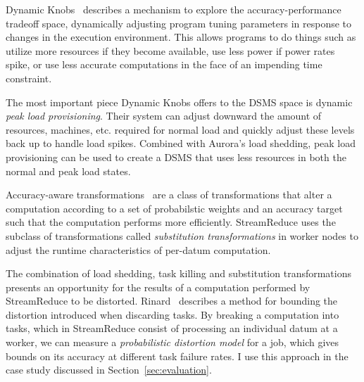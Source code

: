 \documentclass[12pt,twocolumn]{article}
\begin{document}
Dynamic Knobs~\cite{Hoffmann:2011:DKR:1950365.1950390} describes a mechanism to explore the
accuracy-performance tradeoff space, dynamically adjusting program tuning parameters in response
to changes in the execution environment. This allows programs to do things such as
utilize more resources if they become available, use less power if power rates spike,
or use less accurate computations in the face of an impending time constraint.

The most important piece Dynamic Knobs offers to the DSMS space is dynamic
\emph{peak load provisioning}. Their system can adjust downward the amount of resources,
machines, etc. required for normal load and quickly adjust these levels back up to
handle load spikes. Combined with Aurora's load shedding, peak load provisioning can
be used to create a DSMS that uses less resources in both the normal and peak load
states.

Accuracy-aware transformations~\cite{Zhu:2012:RAP:2103656.2103710} are a class of transformations
that alter a computation according to a set of probabilstic weights and an accuracy
target such that the computation performs more efficiently. StreamReduce uses the subclass
of transformations called \emph{substitution transformations} in worker nodes to adjust
the runtime characteristics of per-datum computation.

The combination of load shedding, task killing and substitution transformations presents
an opportunity for the results of a computation performed by StreamReduce to be distorted.
Rinard~\cite{Rinard:2006:PAB:1183401.1183447} describes a method for bounding the distortion
introduced when discarding tasks. By breaking a computation into tasks, which in StreamReduce
consist of processing an individual datum at a worker, we can measure a
\emph{probabilistic distortion model} for a job, which gives bounds on its accuracy at different
task failure rates. I use this approach in the case study discussed in Section~\ref{sec:evaluation}.
\end{document}
